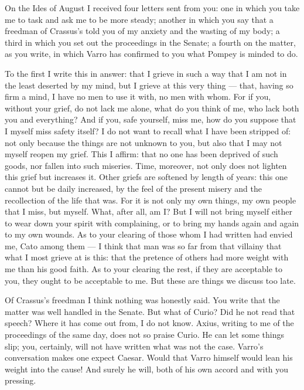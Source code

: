 

 On the Ides of August I received four letters sent from you: one in which you take me to task and ask me to be more steady; another in which you say that a freedman of Crassus's told you of my anxiety and the wasting of my body; a third in which you set out the proceedings in the Senate; a fourth on the matter, as you write, in which Varro has confirmed to you what Pompey is minded to do.

 To the first I write this in answer: that I grieve in such a way that I am not in the least deserted by my mind, but I grieve at this very thing --- that, having so firm a mind, I have no men to use it with, no men with whom. For if you, without your grief, do not lack me alone, what do you think of me, who lack both you and everything? And if you, safe yourself, miss me, how do you suppose that I myself miss safety itself? I do not want to recall what I have been stripped of: not only because the things are not unknown to you, but also that I may not myself reopen my grief. This I affirm: that no one has been deprived of such goods, nor fallen into such miseries. Time, moreover, not only does not lighten this grief but increases it. Other griefs are softened by length of years: this one cannot but be daily increased, by the feel of the present misery and the recollection of the life that was. For it is not only my own things, my own people that I miss, but myself. What, after all, am I? But I will not bring myself either to wear down your spirit with complaining, or to bring my hands again and again to my own wounds. As to your clearing of those whom I had written had envied me, Cato among them --- I think that man was so far from that villainy that what I most grieve at is this: that the pretence of others had more weight with me than his good faith. As to your clearing the rest, if they are acceptable to you, they ought to be acceptable to me. But these are things we discuss too late.

 Of Crassus's freedman I think nothing was honestly said. You write that the matter was well handled in the Senate. But what of Curio? Did he not read that speech? Where it has come out from, I do not know. Axius, writing to me of the proceedings of the same day, does not so praise Curio. He can let some things slip; you, certainly, will not have written what was not the case. Varro's conversation makes one expect Caesar. Would that Varro himself would lean his weight into the cause! And surely he will, both of his own accord and with you pressing.

